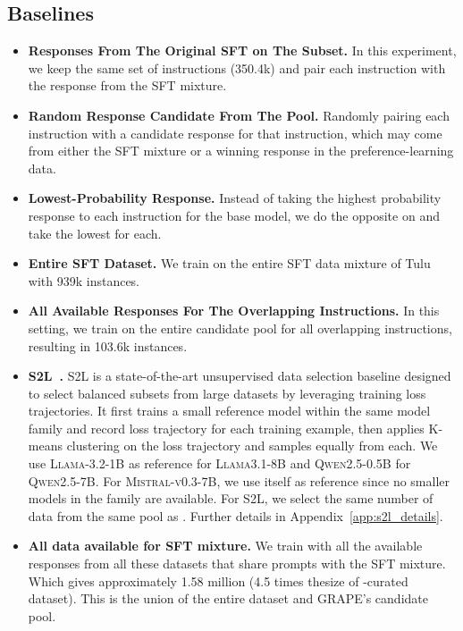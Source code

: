 \subsection{Baselines}
\begin{itemize}
    \item \textbf{Responses From The Original SFT on The Subset.}
In this experiment, we keep the same set of instructions (350.4k) and pair each instruction with the response from the SFT mixture.
\item \textbf{Random Response Candidate From The Pool.} Randomly pairing each instruction with a candidate response for that instruction, which may come from either the SFT mixture or a winning response in the preference-learning data.
\item \textbf{Lowest-Probability Response.} Instead of taking the highest probability response to each instruction for the base model, we do the opposite on  and take the lowest for each. 
\item \textbf{Entire SFT Dataset.} We train on the entire SFT data mixture of Tulu with 939k instances. 
\item \textbf{All Available Responses For The Overlapping Instructions.} In this setting, we train on the entire candidate pool for all overlapping instructions, resulting in 103.6k instances. 
\item \textbf{S2L~\cite{yang2024s2l}.} S2L is a state-of-the-art unsupervised data selection baseline designed to select balanced subsets from large datasets by leveraging training loss trajectories. It first trains a small reference model within the same model family and record loss trajectory for each training example, then applies K-means clustering on the loss trajectory and samples equally from each. We use \textsc{Llama-3.2-1B} as reference for \textsc{Llama3.1-8B} and \textsc{Qwen2.5-0.5B} for \textsc{Qwen2.5-7B}. For \textsc{Mistral-v0.3-7B}, we use itself as reference since no smaller models in the family are available. For S2L, we select the same number of data from the same pool as \name. Further details in Appendix~\ref{app:s2l_details}.
\item \textbf{All data available for SFT mixture.} We train with all the available responses from all these datasets that share prompts with the SFT mixture. Which gives approximately 1.58 million (4.5 times thesize of \name-curated dataset). This is the union of the entire dataset and GRAPE's candidate pool.
\end{itemize}
